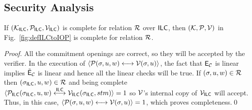 \subsection{Security Analysis}
\label{sec:IPCPsec}
    \begin{theorem}[Completeness]
    If $(\mathcal{K}_{\mathsf{ILC}},\mathcal{P}_{\mathsf{ILC}},\mathcal{V}_{\mathsf{ILC}})$ is complete for relation $\mathcal{R}$ over $\mathsf{ILC}$, then $(\mathcal{K},\mathcal{P},\mathcal{V})$ in Fig.~\ref{fig:defILCtoIOP} is complete for relation $\mathcal{R}$.
    \end{theorem}  
   \begin{proof}
All the commitment openings are correct, so they will be accepted by the verifier. In the execution of $\langle \mathcal{P}(\mathsf{\sigma},u,w)\longleftrightarrow\mathcal{V}(\mathsf{\sigma},u)\rangle$, the fact that $\mathsf{E}_{\mathcal{C}}$ is linear implies $\tilde{\mathsf{E}}_{\mathcal{C}}$ is linear and hence all the linear checks will be true. If $(\mathsf{\sigma},u,w)\in \mathcal{R}$ then $(\mathsf{\sigma}_{\mathsf{ILC}},u,w)\in \mathcal{R}$ and being complete $\langle \mathcal{P}_{\mathsf{ILC}}(\mathsf{\sigma}_{\mathsf{ILC}},u,w)\overset{\mathsf{ILC}}{\longleftrightarrow}\mathcal{V}_{\mathsf{ILC}}(\mathsf{\sigma}_{\mathsf{ILC}},stm)\rangle =1$ so $\mathcal{V}$'s internal copy of $\mathcal{V}_{\mathsf{ILC}}$ will accept. Thus, in this case, $\langle \mathcal{P}(\mathsf{\sigma},u,w)\longleftrightarrow\mathcal{V}(\mathsf{\sigma},u)\rangle=1$, which proves completeness.\qed
    \end{proof}
  
  
